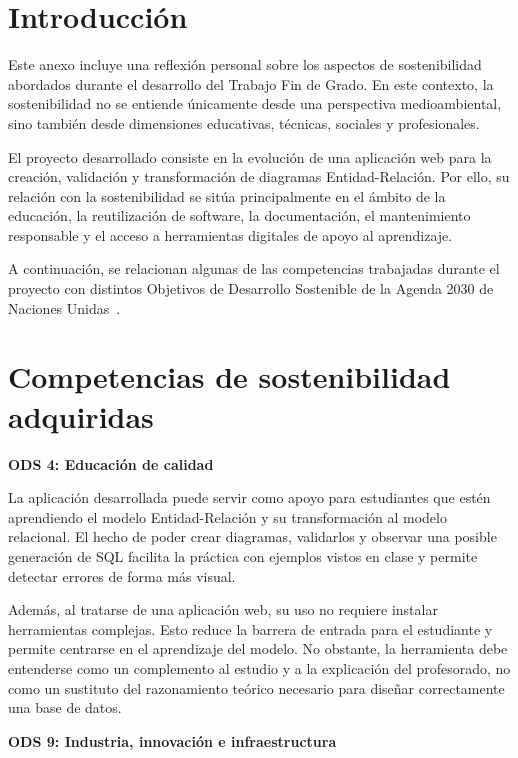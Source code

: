 
\section{Introducción}

Este anexo incluye una reflexión personal sobre los aspectos de sostenibilidad abordados durante el desarrollo del Trabajo Fin de Grado. En este contexto, la sostenibilidad no se entiende únicamente desde una perspectiva medioambiental, sino también desde dimensiones educativas, técnicas, sociales y profesionales.

El proyecto desarrollado consiste en la evolución de una aplicación web para la creación, validación y transformación de diagramas Entidad-Relación. Por ello, su relación con la sostenibilidad se sitúa principalmente en el ámbito de la educación, la reutilización de software, la documentación, el mantenimiento responsable y el acceso a herramientas digitales de apoyo al aprendizaje.

A continuación, se relacionan algunas de las competencias trabajadas durante el proyecto con distintos Objetivos de Desarrollo Sostenible de la Agenda 2030 de Naciones Unidas~\cite{ods-agenda2030}.

\section{Competencias de sostenibilidad adquiridas}

\textbf{ODS 4: Educación de calidad}

La aplicación desarrollada puede servir como apoyo para estudiantes que estén aprendiendo el modelo Entidad-Relación y su transformación al modelo relacional. El hecho de poder crear diagramas, validarlos y observar una posible generación de SQL facilita la práctica con ejemplos vistos en clase y permite detectar errores de forma más visual.

Además, al tratarse de una aplicación web, su uso no requiere instalar herramientas complejas. Esto reduce la barrera de entrada para el estudiante y permite centrarse en el aprendizaje del modelo. No obstante, la herramienta debe entenderse como un complemento al estudio y a la explicación del profesorado, no como un sustituto del razonamiento teórico necesario para diseñar correctamente una base de datos.

\textbf{ODS 9: Industria, innovación e infraestructura}

